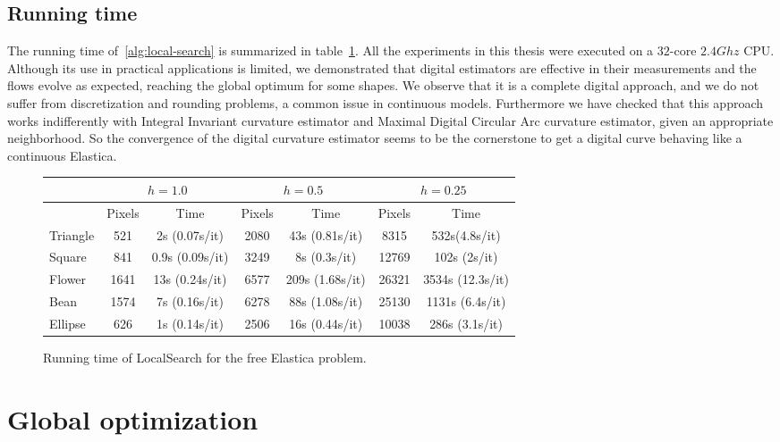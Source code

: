 \subsection{Running time}
\label{ch6:subsec:running-time}

The running time of~\cref{alg:local-search} is summarized in table~\cref{tab:summary-local-comb-rtime}. All the experiments in this thesis were executed on a $32$-core $2.4Ghz$ CPU. Although its use in practical applications is
limited, we demonstrated that digital estimators are effective in their measurements and the flows evolve as expected, reaching the global optimum for some shapes. We
observe that it is a complete digital approach, and we do not suffer from discretization and rounding problems, a common
issue in continuous models.  Furthermore we have checked that this approach works indifferently with Integral Invariant
curvature estimator and Maximal Digital Circular Arc curvature estimator, given an appropriate neighborhood. So the convergence of the digital curvature
estimator seems to be the cornerstone to get a digital curve behaving like a continuous Elastica. 

\begin{figure}[h!]
\center
\captionsetup{type=table}
\begin{tabular}{|l|c|c|c|c|c|c|}
\hline
& \multicolumn{2}{c|}{$h=1.0$} & \multicolumn{2}{c|}{$h=0.5$} & \multicolumn{2}{c|}{$h=0.25$}\\
\hline
& Pixels & Time & Pixels & Time & Pixels & Time\\
\hline
Triangle & 521 & 2s (0.07s/it)  & 2080 & 43s (0.81s/it) & 8315 & 532s(4.8s/it)\\
Square & 841 & 0.9s (0.09s/it) & 3249 & 8s (0.3s/it) & 12769 & 102s (2s/it)\\
Flower & 1641 & 13s (0.24s/it) & 6577 & 209s (1.68s/it) & 26321 & 3534s (12.3s/it)\\
Bean  & 1574 & 7s (0.16s/it) & 6278 & 88s (1.08s/it) & 25130 & 1131s (6.4s/it)\\
Ellipse  & 626 & 1s (0.14s/it) & 2506 & 16s (0.44s/it) & 10038 & 286s (3.1s/it)\\
\hline
\end{tabular}
\caption{Running time of LocalSearch for the free Elastica problem.}
\label{tab:summary-local-comb-rtime} 
\end{figure}





\section{Global optimization}
\label{ch6:sec:global-optimization}

